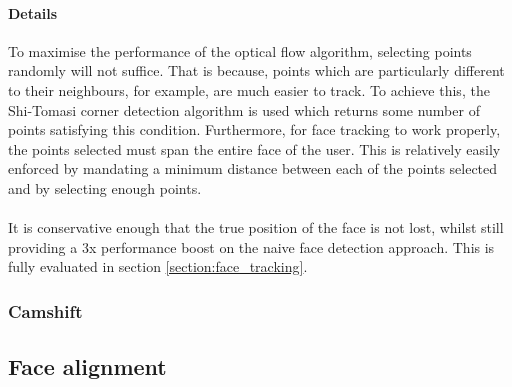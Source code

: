 \paragraph{Details}
To maximise the performance of the optical flow algorithm, selecting points randomly will not suffice. That is because, points which are particularly different to their neighbours, for example, are much easier to track. To achieve this, the Shi-Tomasi corner detection algorithm is used which returns some number of points satisfying this condition. Furthermore, for face tracking to work properly, the points selected must span the entire face of the user. This is relatively easily enforced by mandating a minimum distance between each of the points selected and by selecting enough points. 
\\ \\
It is conservative enough that the true position of the face is not lost, whilst still providing a 3x performance boost on the naive face detection approach. This is fully evaluated in section \ref{section:face_tracking}.

\subsubsection{Camshift}
\subsection{Face alignment}

